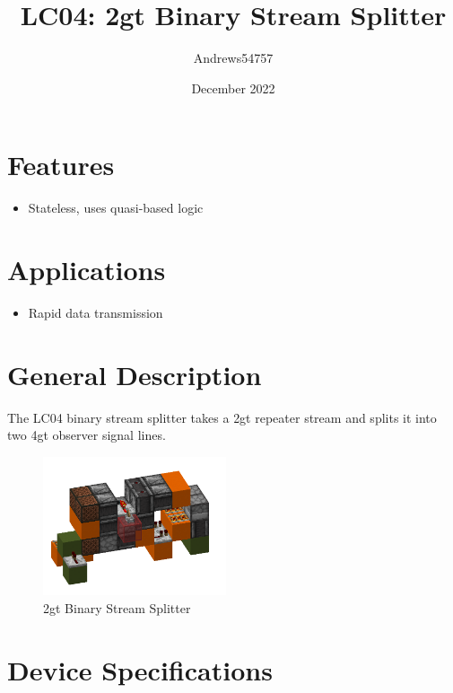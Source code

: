 \documentclass[10pt]{datasheet}
\title{LC04: 2gt Binary Stream Splitter}
\author{Andrews54757}
\date{December 2022}
\begin{document}
\maketitle

\section{Features}

\begin{itemize}
\item{Stateless, uses quasi-based logic}
\end{itemize}

\section{Applications}

\begin{itemize}
\item{Rapid data transmission}
\end{itemize}

\section{General Description}
The LC04 binary stream splitter takes a 2gt repeater stream and splits it into two 4gt observer signal lines.
\vfill\break

\begin{figure}[h]
    \centering
    \includegraphics[width=0.48\textwidth]{stream_split.png}
    \caption{\centering 2gt Binary Stream Splitter}
\end{figure}

\onecolumn

\section{Device Specifications}
\end{document}
